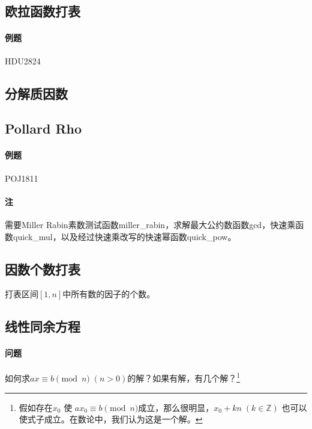 \subsection{欧拉函数打表}

\paragraph{例题} HDU2824



\subsection{分解质因数}


\subsection{Pollard Rho}

\paragraph{例题} POJ1811

\paragraph{注} 需要Miller Rabin素数测试函数miller\_rabin，求解最大公约数函数gcd，快速乘函数quick\_mul，以及经过快速乘改写的快速幂函数quick\_pow。



\subsection{因数个数打表}

打表区间$[1,n]$中所有数的因子的个数。



\subsection{线性同余方程}

\paragraph{问题} 如何求$ax \equiv b \pmod n \; (n>0)$的解？如果有解，有几个解？\footnote{假如存在$x_{0}$ 使 $ax_{0} \equiv b \pmod n$成立，那么很明显，$x_{0}+kn \; (k\in \mathbb{Z})$ 也可以使式子成立。在数论中，我们认为这是一个解。}

